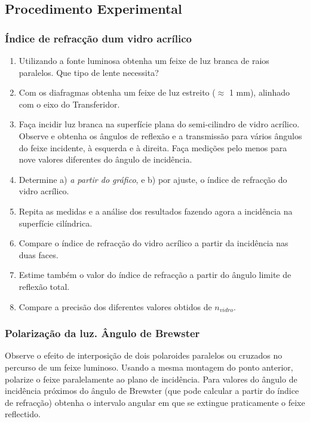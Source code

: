 \documentclass[a4paper,12pt]{article}      %
\begin{document}
\subsection{\sf Procedimento Experimental}

\subsubsection{\sf  Índice de refracção dum vidro acrílico }

\begin{enumerate}
\item Utilizando a  fonte  luminosa  obtenha  um  feixe  de  luz  branca  de  raios  paralelos. Que tipo de lente necessita?
\item Com os diafragmas obtenha um feixe de luz estreito ($\approx$ 1 mm), alinhado com o eixo do Transferidor.
\item Faça  incidir  luz  branca  na  superfície  plana  do  semi-cilindro  de  vidro  acrílico.  Observe  e obtenha os ângulos de 
reflexão e a transmissão para vários ângulos do feixe incidente, à 
esquerda e à direita.  Faça  medições  pelo  menos  para  nove  valores  diferentes  do 
ângulo de incidência.
\item  Determine a) \emph{a partir do gráfico}, e b) por ajuste, o índice de refracção do vidro acrílico.  
\item Repita  as  medidas  e  a  análise  dos  resultados  fazendo  agora  a  incidência  na  superfície cilíndrica. 
\item  Compare o índice de refracção do vidro acrílico a partir da incidência nas duas faces. 
\item Estime também o valor do índice de refracção a partir do ângulo limite de reflexão total. 
\item  Compare a precisão dos diferentes valores obtidos de $n_{vidro}$. 
\end{enumerate}

\subsubsection{\sf Polarização da luz. Ângulo de Brewster}
Observe o efeito de interposição de dois polaroides paralelos ou cruzados no percurso de um feixe luminoso. 
Usando a mesma montagem do ponto anterior, polarize o feixe  paralelamente ao plano
de incidência. Para valores do ângulo de incidência próximos 
do  ângulo  de  Brewster  (que  pode  calcular  a  partir  do  índice de refracção) obtenha   o  intervalo 
angular em que se extingue praticamente o feixe reflectido. 
\end{document}

